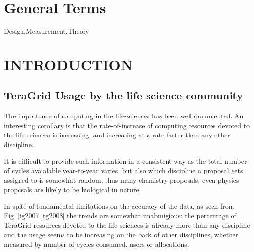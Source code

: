 \documentclass{sig-alternate}
\begin{document}



\section*{General Terms}{Design,Measurement,Theory}






\section{INTRODUCTION}

\subsection{TeraGrid Usage by the life science community}

The importance of computing in the life-sciences has been well
documented. An interesting corollary is that the rate-of-increase of
computing resources devoted to the life-sciences is increasing, and
increasing at a rate faster than any other discipline. 

It is difficult to provide such information in a consistent way
as the total number of cycles avaialable year-to-year varies, but
also which discipline a proposal gets assigned to is somewhat
random; thus many chemistry proposals, even physics proposals
are likely to be biological in nature. 

In spite of fundamental limitations on the accuracy of the data,
as seen from Fig~\ref{tg2007, tg2008} the trends are somewhat
unabmigious: the percentage of TeraGrid resources devoted
to the life-sciences is already more than any discipline and
the usage seems to be increasing on the back of other disciplines, 
whether measured by number of cycles consumed, users or 
allocations.
\end{document}
